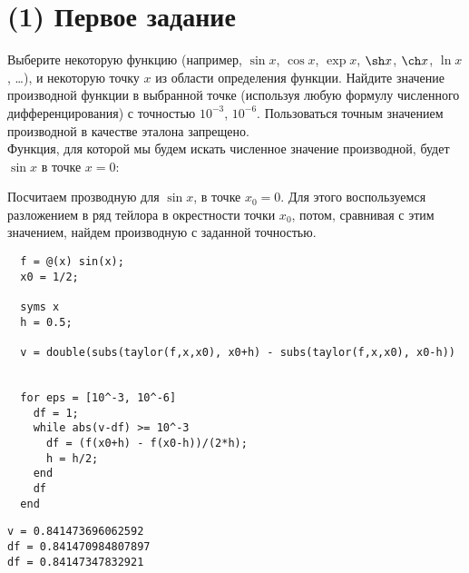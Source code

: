 \maketitle
\tableofcontents
\newpage
\section{(1) Первое задание}
Выберите некоторую функцию (например, $\sin x$, $\cos x$, $\exp x$, $\sh x$, $\ch x$, $\ln x$, \ldots), и некоторую точку $x$ из области определения функции. Найдите значение производной функции в выбранной точке (используя любую формулу численного дифференцирования) с точностью $10^{-3}$, $10^{-6}$. Пользоваться точным значением производной в качестве эталона запрещено.\\[2mm]

Функция, для которой мы будем искать численное значение производной, будет $\sin x$ в точке $x = 0$:


Посчитаем прозводную для $\sin x$, в точке $x_{0} = 0$. Для этого воспользуемся разложением в ряд тейлора в окрестности точки $x_{0}$, потом, сравнивая с этим значением, найдем производную с заданной точностью.

\begin{lstlisting}
  f = @(x) sin(x);
  x0 = 1/2;

  syms x
  h = 0.5;

  v = double(subs(taylor(f,x,x0), x0+h) - subs(taylor(f,x,x0), x0-h))


  for eps = [10^-3, 10^-6]
    df = 1;
    while abs(v-df) >= 10^-3
      df = (f(x0+h) - f(x0-h))/(2*h);
      h = h/2;
    end
    df
  end
\end{lstlisting}

\begin{lstlisting}[backgroundcolor=\color{cyan}]
v = 0.841473696062592
df = 0.841470984807897
df = 0.84147347832921
\end{lstlisting}

